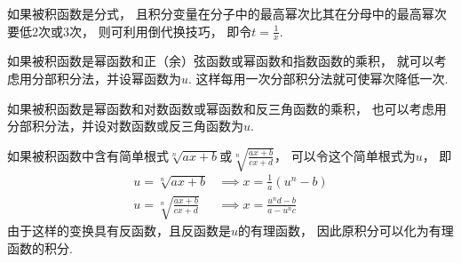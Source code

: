 如果被积函数是分式，
且积分变量在分子中的最高幂次比其在分母中的最高幂次要低2次或3次，
则可利用倒代换技巧，
即令\(t=\frac{1}{x}\).

如果被积函数是幂函数和正（余）弦函数或幂函数和指数函数的乘积，
就可以考虑用分部积分法，并设幂函数为\(u\).
这样每用一次分部积分法就可使幂次降低一次.

如果被积函数是幂函数和对数函数或幂函数和反三角函数的乘积，
也可以考虑用分部积分法，并设对数函数或反三角函数为\(u\).

如果被积函数中含有简单根式\(\sqrt[n]{ax+b}\)或\(\sqrt[n]{\frac{ax+b}{cx+d}}\)，
可以令这个简单根式为\(u\)，
即\begin{align*}
	u=\sqrt[n]{ax+b} &\implies x=\frac{1}{a}(u^n-b) \\
	u=\sqrt[n]{\frac{ax+b}{cx+d}} &\implies x=\frac{u^nd-b}{a-u^nc}
\end{align*}
由于这样的变换具有反函数，且反函数是\(u\)的有理函数，
因此原积分可以化为有理函数的积分.
